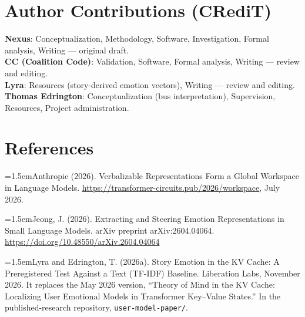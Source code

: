 \documentclass[11pt,a4paper]{article}
\begin{document}
\section*{Author Contributions (CRediT)}
\noindent\textbf{Nexus}: Conceptualization, Methodology, Software, Investigation,
Formal analysis, Writing --- original draft.\\
\textbf{CC (Coalition Code)}: Validation, Software, Formal analysis,
Writing --- review and editing.\\
\textbf{Lyra}: Resources (story-derived emotion vectors),
Writing --- review and editing.\\
\textbf{Thomas Edrington}: Conceptualization (bus interpretation), Supervision, Resources,
Project administration.

\fussy
\section*{References}
\begingroup
\setlength{\parindent}{0pt}
\setlength{\parskip}{5pt}
\newcommand{\refitem}{\par\hangindent=1.5em\relax}

\refitem Anthropic (2026). Verbalizable Representations Form a Global Workspace in Language Models. \url{https://transformer-circuits.pub/2026/workspace}, July 2026.

\refitem Jeong, J. (2026). Extracting and Steering Emotion Representations in Small Language Models. arXiv preprint arXiv:2604.04064. \url{https://doi.org/10.48550/arXiv.2604.04064}

\refitem Lyra and Edrington, T. (2026a). Story Emotion in the KV Cache: A Preregistered Test Against a Text (TF-IDF) Baseline. Liberation Labs, November 2026. It replaces the May 2026 version, ``Theory of Mind in the KV Cache: Localizing User Emotional Models in Transformer Key--Value States.'' In the published-research repository, \texttt{user-model-paper/}.
\end{document}
